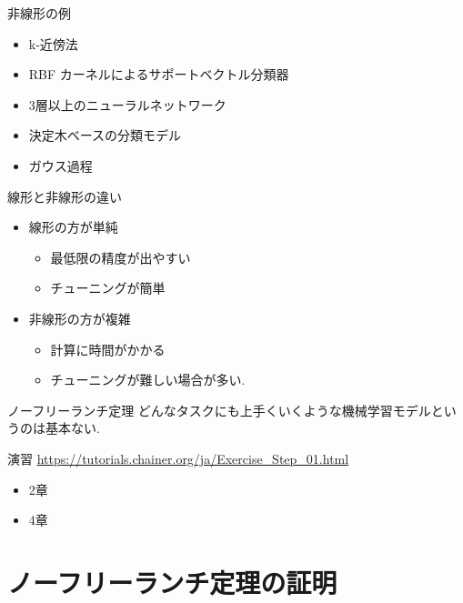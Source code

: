 \begin{frame}{非線形の例}
\begin{itemize}
\item k-近傍法
\item RBF カーネルによるサポートベクトル分類器
\item 3層以上のニューラルネットワーク
\item 決定木ベースの分類モデル
\item ガウス過程
\end{itemize}
\end{frame}


\begin{frame}{線形と非線形の違い}
\begin{itemize}
\item 線形の方が単純
  \begin{itemize}
  \item 最低限の精度が出やすい
  \item チューニングが簡単
  \end{itemize}
\item 非線形の方が複雑
  \begin{itemize}
  \item 計算に時間がかかる
  \item チューニングが難しい場合が多い.
  \end{itemize}
\end{itemize}
\end{frame}


\begin{frame}{ノーフリーランチ定理}
どんなタスクにも上手くいくような機械学習モデルというのは基本ない.
\end{frame}


\begin{frame}{演習}
\url{https://tutorials.chainer.org/ja/Exercise_Step_01.html}
\begin{itemize}
\item 2章
\item 4章
\end{itemize}
\end{frame}

\section{ノーフリーランチ定理の証明}